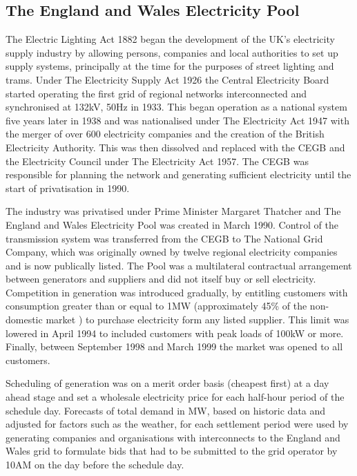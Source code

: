 \subsection{The England and Wales Electricity Pool}
\label{sec:thepool}
The Electric Lighting Act 1882 began the development of the UK's electricity
supply industry by allowing persons, companies and local authorities to set up
supply systems, principally at the time for the purposes of street lighting and
trams.  Under The Electricity Supply Act 1926 the Central Electricity Board
started operating the first grid of regional networks interconnected and
synchronised at 132kV, 50Hz in 1933.  This began operation as a national system
five years later in 1938 and was nationalised under The Electricity Act 1947
with the merger of over 600 electricity companies and the creation of the
British Electricity Authority.  This was then dissolved and replaced with the
CEGB and the Electricity Council under The Electricity Act 1957.  The CEGB was
responsible for planning the network and generating sufficient electricity until the start of privatisation in 1990.

The industry was privatised under Prime Minister
Margaret Thatcher and The England and Wales Electricity Pool was created in
March 1990.  Control of the transmission system was transferred from the
CEGB to The National Grid Company, which was originally owned by twelve
regional electricity companies and is now publically listed.  The Pool was a
multilateral contractual arrangement between generators and suppliers and did
not itself buy or sell electricity.  Competition in generation was introduced
gradually, by entitling customers with consumption greater than or equal
to 1MW (approximately 45\% of the non-domestic market \cite{decc:dukes09}) to
purchase electricity form any listed supplier.  This limit was lowered in April
1994 to included customers with peak loads of 100kW or more.  Finally, between
September 1998 and March 1999 the market was opened to all customers.

Scheduling of generation was on a merit order basis (cheapest first) at a day
ahead stage and set a wholesale electricity price for each half-hour period of
the schedule day.  Forecasts of total demand in MW, based on historic data and
adjusted for factors such as the weather, for each settlement period were used
by generating companies and organisations with interconnects to the England
and Wales grid to formulate bids that had to be submitted to the grid operator
by 10AM on the day before the schedule day.

